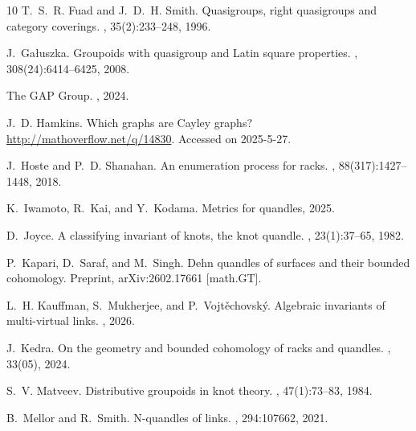 \documentclass{jonasart}
\begin{document}
{\begin{thebibliography}{10}
        T.~S.~R. Fuad and J.~D.~H. Smith.
        \newblock Quasigroups, right quasigroups and category coverings.
        , 35(2):233--248, 1996.
        
        J.~Gałuszka.
        \newblock Groupoids with quasigroup and Latin square properties.
        , 308(24):6414–6425, 2008.
        
        The GAP Group.
        ,
        2024.
        
        J.~D. Hamkins.
        \newblock Which graphs are {C}ayley graphs?
        \newblock \url{http://mathoverflow.net/q/14830}. Accessed on 2025-5-27.
        
        J.~Hoste and P.~D. Shanahan.
        \newblock An enumeration process for racks.
        , 88(317):1427–1448, 2018.
        
        K.~Iwamoto, R.~Kai, and Y.~Kodama.
        \newblock Metrics for quandles, 2025.
        
        D.~Joyce.
        \newblock A classifying invariant of knots, the knot quandle.
        , 23(1):37–65, 1982.
        
        P.~Kapari, D.~Saraf, and M.~Singh.
        \newblock Dehn quandles of surfaces and their bounded cohomology.
        \newblock Preprint, arXiv:2602.17661 [math.GT].
        
        L.~H. Kauffman, S.~Mukherjee, and P.~Vojtěchovský.
        \newblock Algebraic invariants of multi-virtual links.
        , 2026.
        
        J.~Kedra.
        \newblock On the geometry and bounded cohomology of racks and quandles.
        , 33(05), 2024.
        
        S.~V. Matveev.
        \newblock Distributive groupoids in knot theory.
        , 47(1):73–83, 1984.
        
        B.~Mellor and R.~Smith.
        \newblock N-quandles of links.
        , 294:107662, 2021.
        

\end{thebibliography}}
\end{document}
